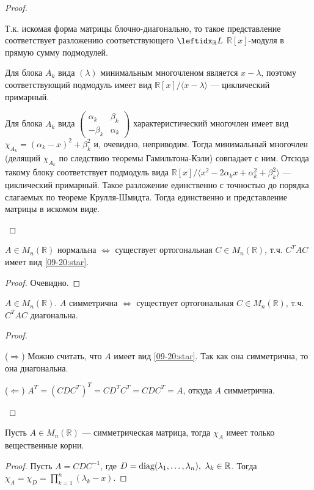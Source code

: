 \begin{proof}
    \begin{proofpart}
        Т.к. искомая форма матрицы блочно-диагонально, то такое представление соответствует разложению соответствующего $\lsub{\mathbb{R}}{L}$ $\mathbb{R}[x]$-модуля в прямую сумму подмодулей.
        
        Для блока $A_k$ вида $(\lambda)$ минимальным многочленом является $x - \lambda$, поэтому соответствующий подмодуль имеет вид $\mathbb{R}[x] / \langle x - \lambda \rangle$ --- циклический примарный.
        
        Для блока $A_k$ вида $\begin{pmatrix}
            \alpha_k & \beta_k \\
            -\beta_k & \alpha_k
        \end{pmatrix}$ характеристический многочлен имеет вид $\chi_{A_k} = (\alpha_k - x)^2 + \beta_k^2$ и, очевидно, неприводим. Тогда минимальный многочлен (делящий $\chi_{A_k}$ по следствию теоремы Гамильтона-Кэли) совпадает с ним. Отсюда такому блоку соответствует подмодуль вида $\mathbb{R}[x] / \langle x^2 - 2 \alpha_k x + \alpha_k^2 + \beta_k^2 \rangle$ --- циклический примарный. Такое разложение единственно с точностью до порядка слагаемых по теореме Крулля-Шмидта. Тогда единственно и представление матрицы в искомом виде.
    \end{proofpart}
\end{proof}

\begin{cor}
    $A \in M_n(\mathbb{R})$ нормальна $\Leftrightarrow$ существует ортогональная $C \in M_n(\mathbb{R})$, т.ч. $C^T AC$ имеет вид \eqref{09-20:star}.
\end{cor}

\begin{proof}
    Очевидно.
\end{proof}

\begin{cor}
    $A \in M_n(\mathbb{R})$. $A$ симметрична $\Leftrightarrow$ существует ортогональная $C \in M_n(\mathbb{R})$, т.ч. $C^T AC$ диагональна.
\end{cor}

\begin{proof}
    \begin{proofpart}{($\Rightarrow$)}
        Можно считать, что $A$ имеет вид \eqref{09-20:star}. Так как она симметрична, то она диагональна.
    \end{proofpart}
    
    \begin{proofpart}{($\Leftarrow$)}
        $A^T = (CDC^T)^T = CD^TC^T = CDC^T = A$, откуда $A$ симметрична.
    \end{proofpart}
\end{proof}

\begin{cor}
    Пусть $A \in M_n(\mathbb{R})$ --- симметрическая матрица, тогда $\chi_A$ имеет только вещественные корни.
\end{cor}

\begin{proof}
    Пусть $A = CDC^{-1}$, где $D = \diag(\lambda_1, \dots, \lambda_n),\ \lambda_k \in \mathbb{R}$. Тогда $\chi_A = \chi_D = \prod_{k=1}^n (\lambda_k - x)$.
\end{proof}